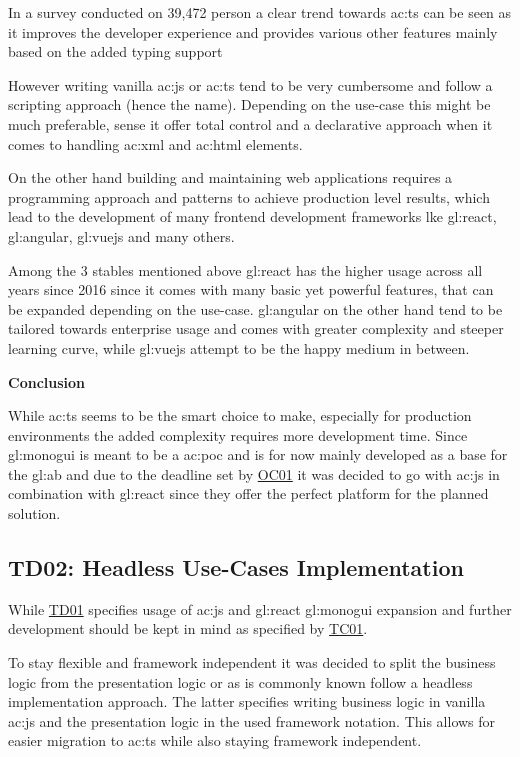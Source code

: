 
In a survey conducted on 39,472 person a clear trend towards \gls{ac:ts} can be seen as it improves the developer experience and provides various other features mainly based on the added typing support \citep{TheStateOfJs}

However writing vanilla \gls{ac:js} or \gls{ac:ts} tend to be very cumbersome and follow a scripting approach (hence the name). Depending on the use-case this might be much preferable, sense it offer total control and a declarative approach when it comes to handling \gls{ac:xml} and \gls{ac:html} elements. 

On the other hand building and maintaining web applications requires a programming approach and patterns to achieve production level results, which lead to the development of many frontend development frameworks lke \gls{gl:react}, \gls{gl:angular}, \gls{gl:vuejs} and many others.

Among the 3 stables mentioned above \gls{gl:react} has the higher usage across all years since 2016 \citep{TheStateOfJs} since it comes with many basic yet powerful features, that can be expanded depending on the use-case. \gls{gl:angular} on the other hand tend to be tailored towards enterprise usage and comes with greater complexity and steeper learning curve, while \gls{gl:vuejs} attempt to be the happy medium in between.

\textbf{Conclusion}

While \gls{ac:ts} seems to be the smart choice to make, especially for production environments the added complexity requires more development time. Since \gls{gl:monogui} is meant to be a \gls{ac:poc} and is for now mainly developed as a base for the \gls{gl:ab} and due to the deadline set by \hyperref[tab:aboc]{OC01} it was decided to go with \gls{ac:js} in combination with \gls{gl:react} since they offer the perfect platform for the planned solution.

\subsection{TD02: Headless Use-Cases Implementation}

While \hyperref[abtd:01]{TD01} specifies usage of \gls{ac:js} and \gls{gl:react} \gls{gl:monogui} expansion and further development should be kept in mind as specified by \hyperref[tab:abtc]{TC01}. 

To stay flexible and framework independent it was decided to split the business logic from the presentation logic or as is commonly known follow a headless implementation approach. The latter specifies writing business logic in vanilla \gls{ac:js} and the presentation logic in the used framework notation. This allows for easier migration to \acrlong{ac:ts} while also staying framework independent. 
